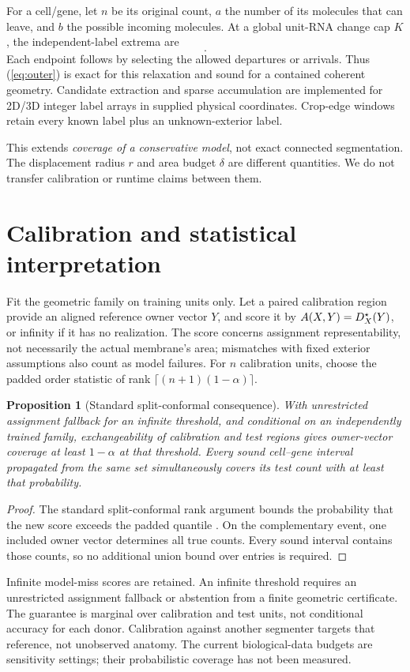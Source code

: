 \documentclass[10pt,letterpaper]{article}
\newtheorem{proposition}[theorem]{Proposition}
\begin{document}
For a cell/gene, let \(n\) be its original count, \(a\) the number of its molecules that can leave, and \(b\) the possible incoming molecules. At a global unit-RNA change cap \(K\), the independent-label extrema are
\begin{equation}
 [n-\min(K,a),\ n+\min(K,b)].\label{eq:outer}
\end{equation}
Each endpoint follows by selecting the allowed departures or arrivals. Thus (\ref{eq:outer}) is exact for this relaxation and sound for a contained coherent geometry. Candidate extraction and sparse accumulation are implemented for 2D/3D integer label arrays in supplied physical coordinates. Crop-edge windows retain every known label plus an unknown-exterior label.

This extends \emph{coverage of a conservative model}, not exact connected segmentation. The displacement radius \(r\) and area budget \(\delta\) are different quantities. We do not transfer calibration or runtime claims between them.

\section{Calibration and statistical interpretation}
Fit the geometric family on training units only. Let a paired calibration region provide an aligned reference owner vector \(Y\), and score it by \(A(X,Y)=D^\star_X(Y)\), or infinity if it has no realization. The score concerns assignment representability, not necessarily the actual membrane's area; mismatches with fixed exterior assumptions also count as model failures. For \(n\) calibration units, choose the padded order statistic of rank
\(\lceil(n+1)(1-\alpha)\rceil\).

\begin{proposition}[Standard split-conformal consequence]
With unrestricted assignment fallback for an infinite threshold, and conditional on an independently trained family, exchangeability of calibration and test regions gives owner-vector coverage at least \(1-\alpha\) at that threshold. Every sound cell--gene interval propagated from the same set simultaneously covers its test count with at least that probability.
\end{proposition}
\begin{proof}
The standard split-conformal rank argument bounds the probability that the new score exceeds the padded quantile \cite{conformal}. On the complementary event, one included owner vector determines all true counts. Every sound interval contains those counts, so no additional union bound over entries is required.
\end{proof}
Infinite model-miss scores are retained. An infinite threshold requires an unrestricted assignment fallback or abstention from a finite geometric certificate. The guarantee is marginal over calibration and test units, not conditional accuracy for each donor. Calibration against another segmenter targets that reference, not unobserved anatomy. The current biological-data budgets are sensitivity settings; their probabilistic coverage has not been measured.
\end{document}
